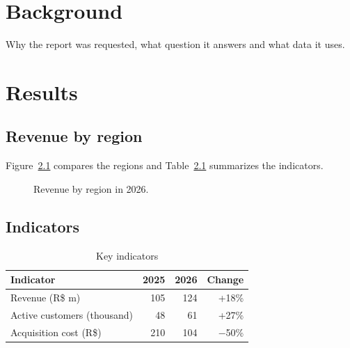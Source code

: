 \documentclass[11pt,a4paper]{report}
\begin{document}
\chapter{Background}
Why the report was requested, what question it answers and what data it uses.

\chapter{Results}
\section{Revenue by region}
Figure~\ref{fig:receita} compares the regions and Table~\ref{tab:indicadores} summarizes the indicators.

\begin{figure}[h]
  \centering
  \caption{Revenue by region in 2026.}\label{fig:receita}
\end{figure}

\section{Indicators}
\begin{table}[h]
  \centering
  \caption{Key indicators}\label{tab:indicadores}
  \begin{tabularx}{0.8\linewidth}{Xrrr}
    \toprule
    Indicator & 2025 & 2026 & Change \\
    \midrule
    Revenue (R\$ m) & 105 & 124 & +18\% \\
    Active customers (thousand) & 48 & 61 & +27\% \\
    Acquisition cost (R\$) & 210 & 104 & $-$50\% \\
    \bottomrule
  \end{tabularx}
\end{table}
\end{document}
